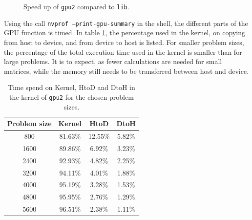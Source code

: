 \begin{figure}[H]
\centering
{}
\caption{Speed up of \texttt{gpu2} compared to \texttt{lib}.}
\label{fig:speed_gpu2}
\end{figure}

\noindent Using the call \texttt{nvprof --print-gpu-summary} in the shell, the different parts of the GPU function is timed. In table \ref{tab:time_gpu2}, the percentage used in the kernel, on copying from host to device, and from device to host is listed. For smaller problem sizes, the percentage of the total execution time used in the kernel is smaller than for large problems. It is to expect, as fewer calculations are needed for small matrices, while the memory still needs to be transferred between host and device.

\begin{table}[H]
    \centering
    \begin{tabular}{c|c c c}
         Problem size&Kernel & HtoD & DtoH \\ \hline
         800 & 81.63\% & 12.55\% & 5.82\% \\
         1600 & 89.86\% & 6.92\% & 3.23\% \\
         2400 & 92.93\% & 4.82\% & 2.25\% \\
         3200 & 94.11\% & 4.01\% & 1.88\% \\
         4000 &95.19\% & 3.28\% & 1.53\%\\
         4800 & 95.95\% & 2.76\% & 1.29\% \\
         5600 & 96.51\% & 2.38\%& 1.11\%
    \end{tabular}
    \caption{Time spend on Kernel, HtoD and DtoH in the kernel of \texttt{gpu2} for the chosen problem sizes.}
    \label{tab:time_gpu2}
\end{table}

